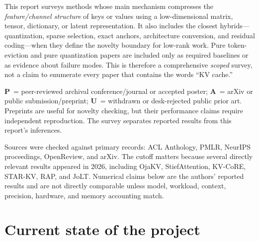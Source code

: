 \documentclass[10pt]{article}
\newcommand{\pub}{\textcolor{green!80!black}{\textbf{P}}}
\newcommand{\pre}{\textcolor{orange!90!black}{\textbf{A}}}
\newcommand{\unpub}{\textcolor{red!85!black}{\textbf{U}}}
\begin{document}
This report surveys methods whose main mechanism compresses the \emph{feature/channel structure}
of keys or values using a low-dimensional matrix, tensor, dictionary, or latent representation.
It also includes the closest hybrids---quantization, sparse selection, exact anchors, architecture
conversion, and residual coding---when they define the novelty boundary for low-rank work.
Pure token-eviction and pure quantization papers are included only as required baselines or as
evidence about failure modes. This is therefore a comprehensive \emph{scoped} survey, not a claim
to enumerate every paper that contains the words ``KV cache.''

\begin{statusbox}[title={Evidence-status legend}]
\pub\ = peer-reviewed archival conference/journal or accepted poster; \quad
\pre\ = arXiv or public submission/preprint; \quad
\unpub\ = withdrawn or desk-rejected public prior art. Preprints are useful for novelty checking,
but their performance claims require independent reproduction. The survey separates reported
results from this report's inferences.
\end{statusbox}

Sources were checked against primary records: ACL Anthology, PMLR, NeurIPS proceedings,
OpenReview, and arXiv. The cutoff matters because several directly relevant results appeared in
2026, including OjaKV, StiefAttention, KV-CoRE, STAR-KV, RAP, and JoLT. Numerical claims below are
the authors' reported results and are not directly comparable unless model, workload, context,
precision, hardware, and memory accounting match.

\section{Current state of the project}
\end{document}
